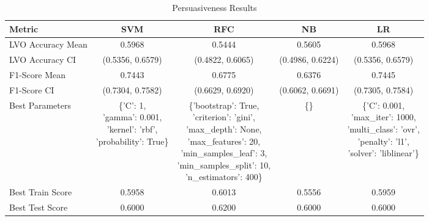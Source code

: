 \begin{table}[h!]
\centering
\begin{tabular}{|l|c|c|c|c|}
\hline
\textbf{Metric}           & \textbf{SVM}    & \textbf{RFC}    & \textbf{NB}     & \textbf{LR}     \\ \hline
LVO Accuracy Mean         & 0.5968          & 0.5444          & 0.5605          & 0.5968          \\ \hline
LVO Accuracy CI           & (0.5356, 0.6579)& (0.4822, 0.6065)& (0.4986, 0.6224)& (0.5356, 0.6579)\\ \hline
F1-Score Mean             & 0.7443          & 0.6775          & 0.6376          & 0.7445          \\ \hline
F1-Score CI               & (0.7304, 0.7582)& (0.6629, 0.6920)& (0.6062, 0.6691)& (0.7305, 0.7584)\\ \hline
Best Parameters           & \makecell[l]{\{'C': 1,\\ 'gamma': 0.001,\\ 'kernel': 'rbf',\\ 'probability': True\}} & \makecell[l]{\{'bootstrap': True,\\ 'criterion': 'gini',\\ 'max\_depth': None, \\'max\_features': 20,\\ 'min\_samples\_leaf': 3,\\ 'min\_samples\_split': 10,\\ 'n\_estimators': 400\}} & \{\} & \makecell[l]{\{'C': 0.001,\\ 'max\_iter': 1000,\\ 'multi\_class': 'ovr',\\ 'penalty': 'l1',\\ 'solver': 'liblinear'\}} \\ \hline
Best Train Score          & 0.5958          & 0.6013          & 0.5556          & 0.5959          \\ \hline
Best Test Score           & 0.6000          & 0.6200          & 0.6000          & 0.6000          \\ \hline
\end{tabular}
\caption{Persuasiveness Results}
\label{table:persuasiveness}
\end{table}
